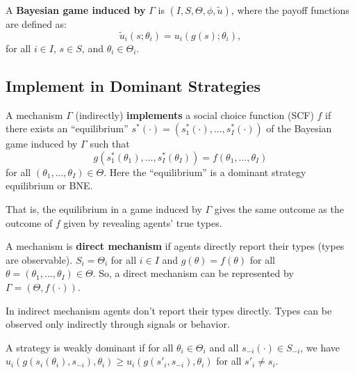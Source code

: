\documentclass[11pt]{elegantbook_2}
\begin{document}
A \textbf{Bayesian game induced by} $\Gamma$ is $(I,S,\Theta,\phi,\tilde{u})$, where the payoff functions are defined as:
\begin{equation}
    \tilde{u}_i(s;\theta_i)=u_i(g(s);\theta_i),
\end{equation}
for all $i\in I$, $s\in S$, and $\theta_i\in\Theta_i$.


\subsection{Implement in Dominant Strategies}
\begin{definition}
    A mechanism $\Gamma$ (indirectly) \textbf{implements} a social choice function (SCF) $f$ if there exists an ``equilibrium'' $s^*(\cdot)=\left(s_1^*(\cdot),...,s_I^*(\cdot)\right)$ of the Bayesian game induced by $\Gamma$ such that $$g(s_1^*(\theta_1),...,s_I^*(\theta_I))=f(\theta_1,...,\theta_I)$$ for all $(\theta_1,...,\theta_I)\in \Theta$. Here the ``equilibrium'' is a dominant strategy equilibrium or BNE.
\end{definition}
That is, the equilibrium in a game induced by $\Gamma$ gives the same outcome as the outcome of $f$ given by revealing agents' true types.

\begin{definition}
    A mechanism is \textbf{direct mechanism} if agents directly report their types (types are observable). $S_i=\Theta_i$ for all $i\in I$ and $g(\theta)=f(\theta)$ for all $\theta=(\theta_1,...,\theta_I)\in\Theta$. So, a direct mechanism can be represented by $\Gamma=(\Theta,f(\cdot))$.
\end{definition}
In indirect mechanism agents don't report their types directly. Types can be observed only indirectly through signals or behavior.

A strategy is weakly dominant if for all $\theta_i\in\Theta_i$ and all $s_{-i}(\cdot)\in S_{-i}$, we have $u_i(g(s_i(\theta_i),s_{-i}),\theta_i)\geq u_i(g(s'_i,s_{-i}),\theta_i)$ for all $s'_i\neq s_i$.
\end{document}
